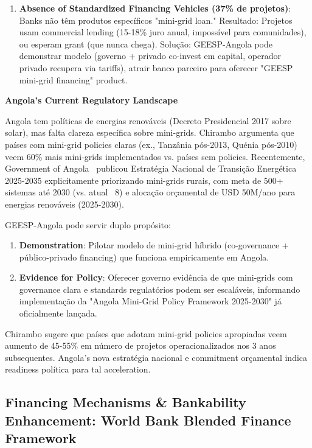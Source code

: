 \documentclass[12pt, a4paper]{article}
\begin{document}
\begin{enumerate}
\item \textbf{Absence of Standardized Financing Vehicles (37\% de projetos)}: Banks não têm produtos específicos "mini-grid loan." Resultado: Projetos usam commercial lending (15-18\% juro anual, impossível para comunidades), ou esperam grant (que nunca chega). Solução: GEESP-Angola pode demonstrar modelo (governo + privado co-invest em capital, operador privado recupera via tariffs), atrair banco parceiro para oferecer "GEESP mini-grid financing" product.

\end{enumerate}

\textbf{Angola's Current Regulatory Landscape}

Angola tem políticas de energias renováveis (Decreto Presidencial 2017 sobre solar), mas falta clareza específica sobre mini-grids. Chirambo argumenta que países com mini-grid policies claras (ex., Tanzânia pós-2013, Quénia pós-2010) veem 60\% mais mini-grids implementados vs. países sem policies. Recentemente, Government of Angola~\citep{GovernmentAngola2024} publicou Estratégia Nacional de Transição Energética 2025-2035 explicitamente priorizando mini-grids rurais, com meta de 500+ sistemas até 2030 (vs. atual ~8) e alocação orçamental de USD 50M/ano para energias renováveis (2025-2030).

GEESP-Angola pode servir duplo propósito:
\begin{enumerate}
\item \textbf{Demonstration}: Pilotar modelo de mini-grid híbrido (co-governance + público-privado financing) que funciona empiricamente em Angola.
\item \textbf{Evidence for Policy}: Oferecer governo evidência de que mini-grids com governance clara e standards regulatórios podem ser escaláveis, informando implementação da "Angola Mini-Grid Policy Framework 2025-2030" já oficialmente lançada.
\end{enumerate}

Chirambo sugere que países que adotam mini-grid policies apropiadas veem aumento de 45-55\% em número de projetos operacionalizados nos 3 anos subsequentes. Angola's nova estratégia nacional e commitment orçamental indica readiness política para tal acceleration.

\subsection{Financing Mechanisms & Bankability Enhancement: World Bank Blended Finance Framework}
\end{document}
